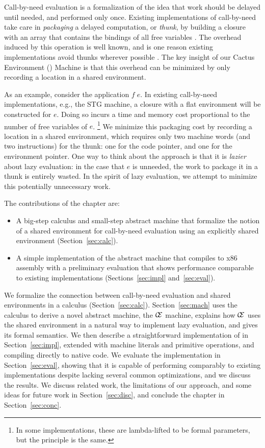 Call-by-need evaluation is a formalization of the idea that work
should be delayed until needed, and performed only once.  Existing
implementations of call-by-need take care in \emph{packaging} a delayed
computation, or \emph{thunk}, by building a closure with an array that contains
the bindings of all free variables \cite{jonesstg,boquist1997grin}. The overhead
induced by this operation is well known, and is one reason existing implementations
avoid thunks wherever possible \cite{johnsson1984efficient}. The key insight of
our Cactus Environment (\ce) Machine is that this overhead can be
minimized by only recording a location in a shared environment.

As an example, consider the application $f \; e$. In existing call-by-need
implementations, e.g., the STG machine\cite{jonesstg}, a closure with a flat
environment will be constructed for $e$.  Doing so incurs a time and memory cost
proportional to the number of free variables of $e$. \footnote{In some
implementations, these are lambda-lifted to be formal parameters, but the
principle is the same.} We minimize this packaging cost by recording a
location in a shared environment, which requires only two
machine words (and two instructions) for the thunk: one for the code pointer,
and one for the environment pointer. One way to think about the approach is that
it is \emph{lazier} about lazy evaluation: in the case that $e$ is unneeded, the
work to package it in a thunk is entirely wasted. In the spirit of lazy
evaluation, we attempt to minimize this potentially unnecessary work.  

The contributions of the chapter are:
\begin{itemize}
\item A big-step calculus and small-step abstract machine that formalize the
notion of a shared environment for call-by-need evaluation using an explicitly
shared environment (Section~\ref{sec:calc}).
\item A simple implementation of the abstract machine that compiles to x86
assembly with a preliminary evaluation that shows performance comparable to
existing implementations (Sections~\ref{sec:impl} and~\ref{sec:eval}).
\end{itemize}

We formalize the connection between call-by-need evaluation and shared
environments in a calculus (Section~\ref{sec:calc}).  Section~\ref{sec:mach}
uses the calculus to derive a novel abstract machine, the $\mathcal{\mathcal{C}
\mskip -4mu \mathcal{E}}$ machine, explains how $\mathcal{\mathcal{C} \mskip
-4mu \mathcal{E}}$ uses the shared environment in a natural way to implement
lazy evaluation, and gives its formal semantics.  We then describe a
straightforward implementation of \ce in Section~\ref{sec:impl}, extended with
machine literals and primitive operations, and compiling directly to native
code. We evaluate the implementation in Section~\ref{sec:eval}, showing that it
is capable of performing comparably to existing implementations despite lacking
several common optimizations, and we discuss the results. We discuss related
work, the limitations of our approach, and some ideas for future work in
Section~\ref{sec:disc}, and conclude the chapter in Section~\ref{sec:conc}.


